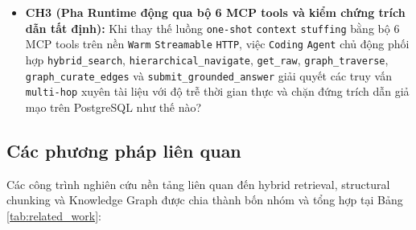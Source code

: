\begin{itemize}
\begin{itemize}
        \item \textbf{CH3 (Pha Runtime động qua bộ 6 MCP tools và kiểm chứng trích dẫn tất định):} Khi thay thế luồng \texttt{one-shot} \texttt{context} \texttt{stuffing} bằng bộ 6 MCP tools trên nền \texttt{Warm} \texttt{Stream\allowbreak able} \texttt{HTTP}, việc \texttt{Coding} \texttt{Agent} chủ động phối hợp \texttt{hybrid\_\allowbreak search}, \texttt{hierar\allowbreak chical\_\allowbreak navigate}, \texttt{get\_\allowbreak raw}, \texttt{graph\_\allowbreak traverse}, \texttt{graph\_\allowbreak curate\_\allowbreak edges} và \texttt{submit\_\allowbreak grounded\_\allowbreak answer} giải quyết các truy vấn \texttt{multi-hop} xuyên tài liệu với độ trễ thời gian thực và chặn đứng trích dẫn giả mạo trên PostgreSQL như thế nào?
    \end{itemize}
\end{itemize}

\subsection{Các phương pháp liên quan}
Các công trình nghiên cứu nền tảng liên quan đến hybrid retrieval, structural chunking và Knowledge Graph được chia thành bốn nhóm và tổng hợp tại Bảng \ref{tab:related_work}:

